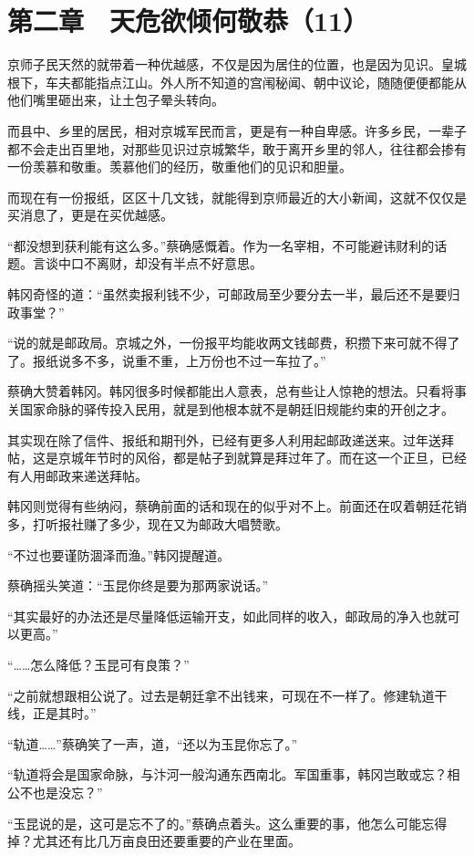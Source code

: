 \section{第二章　天危欲倾何敬恭（11）}

京师子民天然的就带着一种优越感，不仅是因为居住的位置，也是因为见识。皇城根下，车夫都能指点江山。外人所不知道的宫闱秘闻、朝中议论，随随便便都能从他们嘴里砸出来，让土包子晕头转向。

而县中、乡里的居民，相对京城军民而言，更是有一种自卑感。许多乡民，一辈子都不会走出百里地，对那些见识过京城繁华，敢于离开乡里的邻人，往往都会掺有一份羡慕和敬重。羡慕他们的经历，敬重他们的见识和胆量。

而现在有一份报纸，区区十几文钱，就能得到京师最近的大小新闻，这就不仅仅是买消息了，更是在买优越感。

“都没想到获利能有这么多。”蔡确感慨着。作为一名宰相，不可能避讳财利的话题。言谈中口不离财，却没有半点不好意思。

韩冈奇怪的道：“虽然卖报利钱不少，可邮政局至少要分去一半，最后还不是要归政事堂？”

“说的就是邮政局。京城之外，一份报平均能收两文钱邮费，积攒下来可就不得了了。报纸说多不多，说重不重，上万份也不过一车拉了。”

蔡确大赞着韩冈。韩冈很多时候都能出人意表，总有些让人惊艳的想法。只看将事关国家命脉的驿传投入民用，就是到他根本就不是朝廷旧规能约束的开创之才。

其实现在除了信件、报纸和期刊外，已经有更多人利用起邮政递送来。过年送拜帖，这是京城年节时的风俗，都是帖子到就算是拜过年了。而在这一个正旦，已经有人用邮政来递送拜帖。

韩冈则觉得有些纳闷，蔡确前面的话和现在的似乎对不上。前面还在叹着朝廷花销多，打听报社赚了多少，现在又为邮政大唱赞歌。

“不过也要谨防涸泽而渔。”韩冈提醒道。

蔡确摇头笑道：“玉昆你终是要为那两家说话。”

“其实最好的办法还是尽量降低运输开支，如此同样的收入，邮政局的净入也就可以更高。”

“……怎么降低？玉昆可有良策？”

“之前就想跟相公说了。过去是朝廷拿不出钱来，可现在不一样了。修建轨道干线，正是其时。”

“轨道……”蔡确笑了一声，道，“还以为玉昆你忘了。”

“轨道将会是国家命脉，与汴河一般沟通东西南北。军国重事，韩冈岂敢或忘？相公不也是没忘？”

“玉昆说的是，这可是忘不了的。”蔡确点着头。这么重要的事，他怎么可能忘得掉？尤其还有比几万亩良田还要重要的产业在里面。


